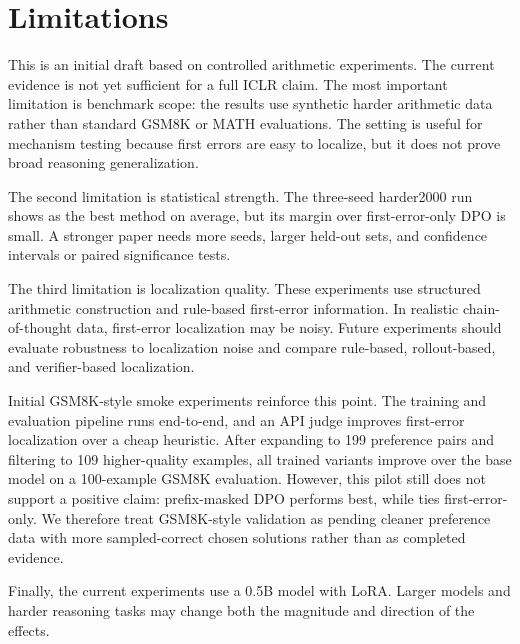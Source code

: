 \section{Limitations}

This is an initial draft based on controlled arithmetic experiments. The current evidence is not yet sufficient for a full ICLR claim. The most important limitation is benchmark scope: the results use synthetic harder arithmetic data rather than standard GSM8K or MATH evaluations. The setting is useful for mechanism testing because first errors are easy to localize, but it does not prove broad reasoning generalization.

The second limitation is statistical strength. The three-seed harder2000 run shows \cmdpo as the best method on average, but its margin over first-error-only DPO is small. A stronger paper needs more seeds, larger held-out sets, and confidence intervals or paired significance tests.

The third limitation is localization quality. These experiments use structured arithmetic construction and rule-based first-error information. In realistic chain-of-thought data, first-error localization may be noisy. Future experiments should evaluate robustness to localization noise and compare rule-based, rollout-based, and verifier-based localization.

Initial GSM8K-style smoke experiments reinforce this point. The training and evaluation pipeline runs end-to-end, and an API judge improves first-error localization over a cheap heuristic. After expanding to 199 preference pairs and filtering to 109 higher-quality examples, all trained variants improve over the base model on a 100-example GSM8K evaluation. However, this pilot still does not support a positive \cmdpo{} claim: prefix-masked DPO performs best, while \cmdpo{} ties first-error-only. We therefore treat GSM8K-style validation as pending cleaner preference data with more sampled-correct chosen solutions rather than as completed evidence.

Finally, the current experiments use a 0.5B model with LoRA. Larger models and harder reasoning tasks may change both the magnitude and direction of the effects.
